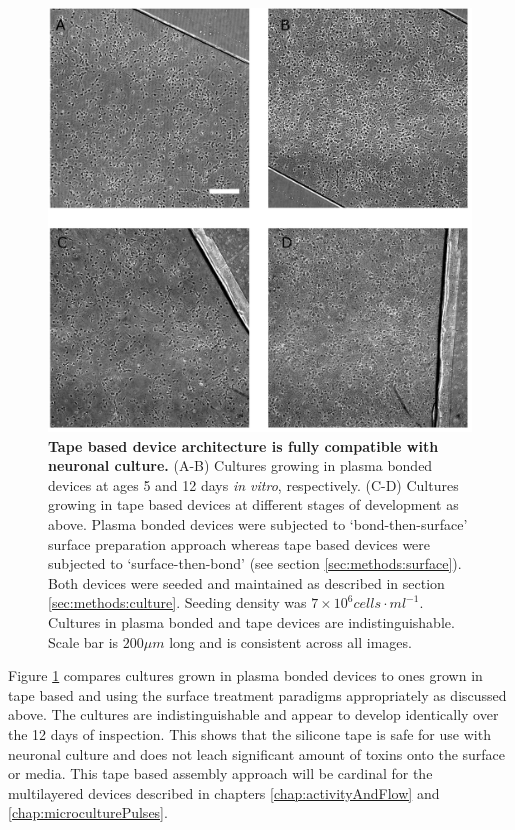         \begin{figure}[!htb]
            \centering
            \includegraphics[width=15cm]{chapter4/figures/tapeCultures/tapeCultures.jpg}
            \caption[Comparison between cultures growing in plasma bonded devices and tape based devices]{\textbf{Tape based device architecture is fully compatible with neuronal culture.} (A-B) Cultures growing in plasma bonded devices at ages 5 and 12 days \textit{in vitro}, respectively. (C-D) Cultures growing in tape based devices at different stages of development as above. Plasma bonded devices were subjected to `bond-then-surface' surface preparation approach whereas tape based devices were subjected to `surface-then-bond' (see section \ref{sec:methods:surface}). Both devices were seeded and maintained as described in section \ref{sec:methods:culture}. Seeding density was \(7\times10^6 cells\cdot ml^{-1}\). Cultures in plasma bonded and tape devices are indistinguishable. Scale bar is \(200 \mu m\) long and is consistent across all images.}
            \label{fig:devices:tapeCultures}
        \end{figure}

        Figure \ref{fig:devices:tapeCultures} compares cultures grown in plasma bonded devices to ones grown in tape based and using the surface treatment paradigms appropriately as discussed above. The cultures are indistinguishable and appear to develop identically over the 12 days of inspection. This shows that the silicone tape is safe for use with neuronal culture and does not leach significant amount of toxins onto the surface or media. This tape based assembly approach will be cardinal for the multilayered devices described in chapters \ref{chap:activityAndFlow} and \ref{chap:microculturePulses}.



